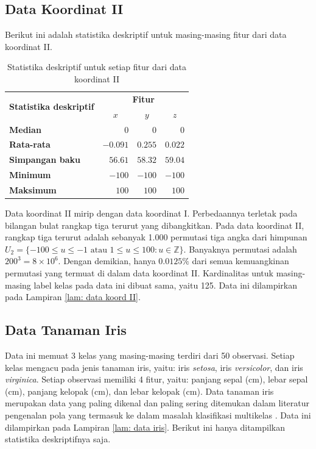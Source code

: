\subsection{Data Koordinat II} \label{tentang dk2}
\noindent Berikut ini adalah statistika deskriptif untuk masing-masing fitur dari data koordinat II.

\begin{table}[htbp!]
  \centering
  \caption{Statistika deskriptif untuk setiap fitur dari data koordinat II}
    \begin{tabular}{lrrr}
    \toprule
    \multicolumn{1}{c}{\multirow{2}[4]{*}{\textbf{Statistika deskriptif}}} & \multicolumn{3}{c}{\textbf{Fitur}} \\
\cmidrule{2-4}          & \multicolumn{1}{c}{\boldmath{}$x$\unboldmath{}} & \multicolumn{1}{c}{\boldmath{}$y$\unboldmath{}} & \multicolumn{1}{c}{\boldmath{}$z$\unboldmath{}} \\
\cmidrule{2-4}    \textbf{Median} & $\num{0}$ & $\num{0}$ & $\num{0}$ \\
    \textbf{Rata-rata} & $\num{-0,091}$ & $\num{0,255}$ & $\num{0,022}$ \\
    \textbf{Simpangan baku} & $\num{56,61}$ & $\num{58,32}$ & $\num{59,04}$ \\
    \textbf{Minimum} & $\num{-100}$ & $\num{-100}$ & $\num{-100}$ \\
    \textbf{Maksimum} & $\num{100}$ & $\num{100}$ & $\num{100}$ \\
    \bottomrule
    \end{tabular}%
  \label{tab: stat desc dk2}%
\end{table}%

\noindent Data koordinat II mirip dengan data koordinat I. Perbedaannya terletak pada bilangan bulat rangkap tiga terurut yang dibangkitkan. Pada data koordinat II, rangkap tiga terurut adalah sebanyak 1.000 permutasi tiga angka dari himpunan $U_2 = \{-100\leq u \leq -1 \text{ atau } 1 \leq u \leq 100 : u \in \mathbb{Z} \}$. Banyaknya permutasi adalah $200^3 = 8\times 10^6$. Dengan demikian, hanya $\num{0,0125}\%$ dari semua kemuangkinan permutasi  yang termuat di dalam data koordinat II. Kardinalitas untuk masing-masing label kelas pada data ini dibuat sama, yaitu 125. Data ini dilampirkan pada Lampiran \ref{lam: data koord II}.

\subsection{Data Tanaman Iris} \label{tentang d iris}
\noindent Data ini memuat 3 kelas yang masing-masing terdiri dari 50 observasi. Setiap kelas mengacu pada jenis tanaman iris, yaitu: iris \emph{setosa}, iris \emph{versicolor}, dan iris \emph{virginica}. Setiap observasi memiliki 4 fitur, yaitu: panjang sepal (cm), lebar sepal (cm), panjang kelopak (cm), dan lebar kelopak (cm). Data tanaman iris merupakan data yang paling dikenal dan paling sering ditemukan dalam literatur pengenalan pola yang termasuk ke dalam masalah klasifikasi multikelas \cite{Dua:2019}. Data ini dilampirkan pada Lampiran \ref{lam: data iris}. Berikut ini hanya ditampilkan statistika deskriptifnya saja.

